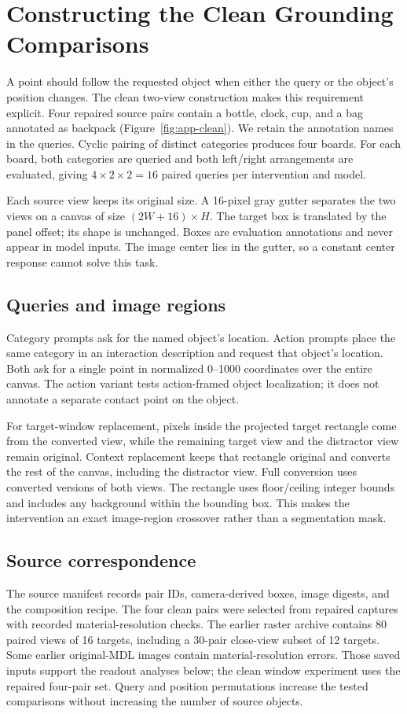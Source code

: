 \section{Constructing the Clean Grounding Comparisons}
\label{app:construction}

A point should follow the requested object when either the query or the
object's position changes. The clean two-view construction makes this
requirement explicit. Four repaired source pairs contain a bottle, clock, cup,
and a bag annotated as backpack (Figure~\ref{fig:app-clean}). We retain the
annotation names in the queries. Cyclic pairing of distinct categories produces
four boards. For each board, both categories are queried and both left/right
arrangements are evaluated, giving $4\times2\times2=16$ paired queries per
intervention and model.

Each source view keeps its original size. A 16-pixel gray gutter separates the
two views on a canvas of size $(2W+16)\times H$. The target box is translated
by the panel offset; its shape is unchanged. Boxes are evaluation annotations
and never appear in model inputs. The image center lies in the gutter, so a
constant center response cannot solve this task.

\subsection{Queries and image regions}
Category prompts ask for the named object's location. Action prompts place the
same category in an interaction description and request that object's location.
Both ask for a single point in normalized 0--1000 coordinates over the entire
canvas. The action variant tests action-framed object localization; it does
not annotate a separate contact point on the object.

For target-window replacement, pixels inside the projected target rectangle
come from the converted view, while the remaining target view and the distractor
view remain original. Context replacement keeps that rectangle original and
converts the rest of the canvas, including the distractor view. Full conversion
uses converted versions of both views. The rectangle uses floor/ceiling integer
bounds and includes any background within the bounding box. This makes the
intervention an exact image-region crossover rather than a segmentation mask.

\subsection{Source correspondence}
The source manifest records pair IDs, camera-derived boxes, image digests, and
the composition recipe. The four clean pairs were selected from repaired
captures with recorded material-resolution checks. The earlier raster archive
contains 80 paired views of 16 targets, including a 30-pair close-view subset
of 12 targets. Some earlier original-MDL images contain material-resolution
errors. Those saved inputs support the readout analyses below; the clean window
experiment uses the repaired four-pair set. Query and position permutations
increase the tested comparisons without increasing the number of source objects.

